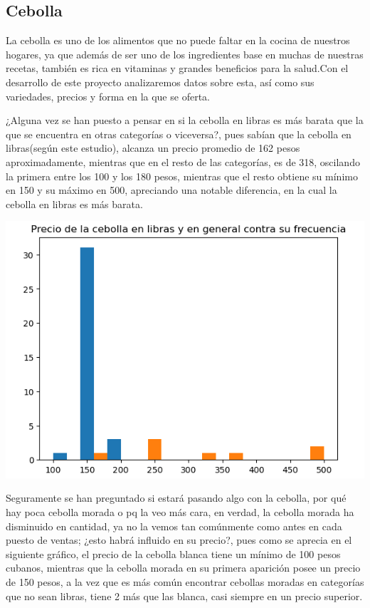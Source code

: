 \documentclass[a4paper,11pt]{article}
\begin{document}
\subsection{Cebolla}
La cebolla es uno de los alimentos que no puede faltar en la cocina de nuestros hogares, ya que además de ser uno de los ingredientes base en muchas de nuestras recetas, también es rica en vitaminas y grandes beneficios para la salud.Con el desarrollo de este proyecto analizaremos datos sobre esta, así como sus variedades, precios y forma en la que se oferta.
\par\vspace{2pt}
¿Alguna vez se han puesto a pensar en si la cebolla en libras es más barata que la que se encuentra en otras categorías o viceversa?, pues sabían que la cebolla en libras(según este estudio), alcanza un precio promedio de 162 pesos aproximadamente, mientras que en el resto de las categorías, es de 318, oscilando la primera entre los 100 y los 180 pesos, mientras que el resto obtiene su mínimo en 150 y su máximo en 500, apreciando una notable diferencia, en la cual la cebolla en libras es más barata.
\par\vspace{2pt}
\begin{minipage}{0.5\textwidth}
  \begin{center}
    \includegraphics[width=1.5\textwidth]{precio de cebolla.png}
  \end{center}
\end{minipage}
\par\vspace{2pt}
Seguramente se han preguntado si estará pasando algo con la cebolla, por qué hay poca cebolla morada o pq la veo más cara, en verdad, la cebolla morada ha disminuido en cantidad, ya no la vemos tan comúnmente como antes en cada puesto de ventas; ¿esto habrá influido en su precio?, pues como se aprecia en el siguiente gráfico, el precio de la cebolla blanca tiene un mínimo de 100 pesos cubanos, mientras que la cebolla morada en su primera aparición posee un precio de 150 pesos, a la vez que es más común encontrar cebollas moradas en categorías que no sean libras, tiene 2 más que las blanca, casi siempre en un precio superior.
\end{document}
